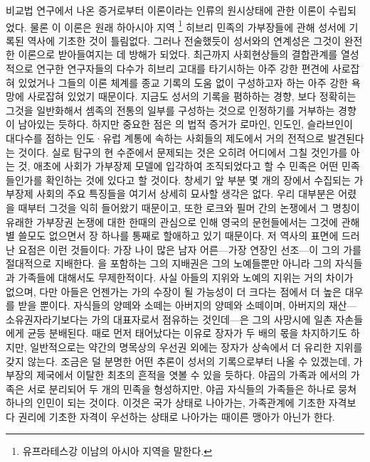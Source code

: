 비교법 연구에서 나온 증거로부터
 이론이라는
인류의 원시상태에 관한 이론이 수립되었다.
물론 이 이론은 원래 하아시아 지역%
\footnote{유프라테스강 이남의 아시아 지역을 말한다.}
히브리 민족의 가부장들에 관해 성서에 기록된 역사에 기초한 것이 틀림없다.
그러나 전술했듯이 성서와의 연계성은 그것이 완전한 이론으로
받아들여지는 데 방해가 되었다.
최근까지 사회현상들의 결합관계를 열성적으로 연구한 연구자들의 다수가
히브리 고대를 타기시하는 아주 강한 편견에 사로잡혀 있었거나
그들의 이론 체계를
종교 기록의 도움 없이
구성하고자 하는
아주 강한 욕망에 사로잡혀 있었기 때문이다.
지금도 성서의 기록을 폄하하는 경향,
보다 정확히는 그것을 일반화해서
셈족의 전통의 일부를 구성하는 것으로 인정하기를 거부하는
경향이 남아있는 듯하다.
하지만 중요한 점은 의 법적 증거가
로마인, 인도인, 슬라브인이 대다수를 점하는
인도^^b7유럽 계통에 속하는 사회들의 제도에서 거의 전적으로 발견된다는 것이다.
실로 탐구의 현 수준에서 문제되는 것은 오히려 어디에서 그칠 것인가를 아는 것,
애초에 사회가 가부장제 모델에 입각하여 조직되었다고 할 수 
민족은 어떤 민족들인가를 확인하는 것에 있다고 할 것이다.
창세기 앞 부분 몇 개의 장에서 수집되는 가부장제 사회의 주요 특징들을
여기서 상세히 묘사할 생각은 없다.
우리 대부분은 어렸을 때부터 그것을 익히 들어왔기 때문이고, 또한
로크와 필머 간의 논쟁에서 그 명칭이 유래한 가부장권 논쟁에 대한
한때의 관심으로 인해
영국의 문헌들에서는
그것에 관해
별 쓸모도 없으면서
장 하나를 통째로 할애하고 있기 때문이다.
저 역사의 표면에 드러난 요점은 이런 것들이다:
가장 나이 많은 남자 어른---가장 연장인 선조---이 그의 가를
절대적으로 지배한다.
을 포함하는 그의 지배권은 그의 노예들뿐만 아니라
그의 자식들과 가족들에 대해서도 무제한적이다.
사실 아들의 지위와 노예의 지위는 거의 차이가 없으며,
다만 아들은 언젠가는 가의 수장이 될 가능성이 더 크다는 점에서 더 높은 대우를
받을 뿐이다.
자식들의 양떼와 소떼는 아버지의 양떼와 소떼이며,
아버지의 재산---소유권자라기보다는 가의 대표자로서 점유하는 것인데---은
그의 사망시에 일촌 자손들에게 균등 분배된다.
때로 먼저 태어났다는 이유로 장자가 두 배의 몫을 차지하기도 하지만,
일반적으로는 약간의 명목상의 우선권 외에는 장자가 상속에서 더 유리한
지위를 갖지 않는다.
조금은 덜 분명한 어떤 추론이 성서의 기록으로부터 나올 수 있겠는데,
가부장의 제국에서 이탈한 최초의 흔적을 엿볼 수 있을 듯하다.
야곱의 가족과 에서의 가족은 서로 분리되어 두 개의 민족을 형성하지만,
야곱 자식들의 가족들은 하나로 뭉쳐 하나의 인민이 되는 것이다.
이것은 국가 상태로 나아가는,
가족관계에 기초한 자격보다 권리에 기초한 자격이 우선하는 상태로 나아가는
때이른 맹아가 아닌가 한다.

